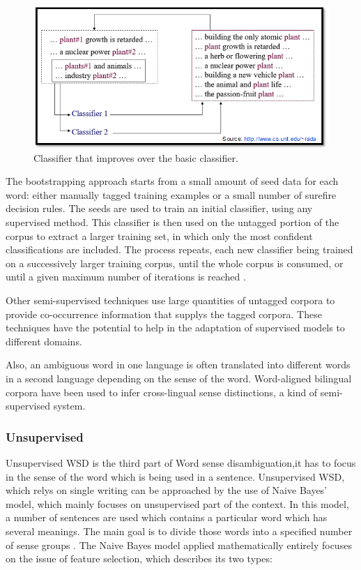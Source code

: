 \begin{figure}[tbh]
	\begin{center}
		\includegraphics[width=\columnwidth]{Union_Background_Chart_semi}
	\end{center}
	\caption{Classifier that improves over the basic classifier. \label{fig3}}
\end{figure}

The bootstrapping approach starts from a small amount of seed data for each word: either manually tagged training examples or 
a small number of surefire decision rules. 
The seeds are used to train an initial classifier, using any supervised method. This classifier is then used on the untagged portion of the corpus to extract a larger training set, in which only the most confident classifications are included. 
The process repeats, each new classifier being trained on a successively larger training corpus, until the whole corpus is consumed, or until a given maximum number of iterations is reached \cite{Blascheck2016}.

Other semi-supervised techniques use large quantities of untagged corpora to provide co-occurrence information that supplys 
the tagged corpora. 
These techniques have the potential to help in the adaptation of supervised models to different domains.

Also, an ambiguous word in one language is often translated into different words in a second language depending on the sense 
of the word. 
Word-aligned bilingual corpora have been used to infer cross-lingual sense distinctions, a kind of semi-supervised system.\cite{Cheslow2014}

\subsubsection*{Unsupervised}
Unsupervised WSD is the third part of Word sense disambiguation,it has to focus in the sense of the word which is being used 
in a sentence.  
Unsupervised WSD, which relys on single writing can be approached by the use of Naive Bayes' model, which mainly focuses on unsupervised part of the context. 
In this model, a number of sentences are used which contains a particular word which has several meanings. 
The main goal is to divide those words into a specified number of sense groups \cite{4028513}.
The Naive Bayes model applied mathematically entirely focuses on the issue of feature selection, which describes its two types:

